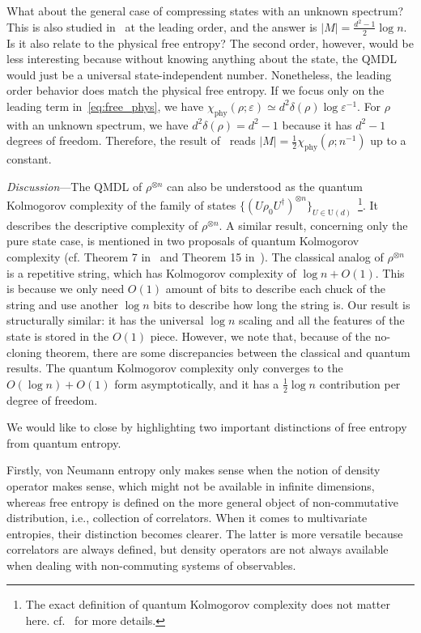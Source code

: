 \documentclass[aps,pre,twocolumn,superscriptaddress,amsmath,amssymb,reprint]{revtex4-2}
\def\eps{\varepsilon}
\begin{document}
What about the general case of compressing states with an unknown spectrum? This is also studied in~\cite{yang2016optimal,yang2018compression} at the leading order, and the answer is $|M| = \frac{d^2-1}{2}\log n$. Is it also relate to the physical free entropy?  The second order, however, would be less interesting because without knowing anything about the state, the QMDL would just be a universal state-independent number. Nonetheless, the leading order behavior does match the physical free entropy. If we focus only on the leading term in~\ref{eq:free_phys}, we have $\chi_\mathrm{phy}(\rho;\eps)\simeq d^2\delta(\rho)\log\eps^{-1}$. For $\rho$ with an unknown spectrum, we have $d^2\delta(\rho) = d^2-1$ because it has $d^2-1$ degrees of freedom. Therefore, the result of~\cite{yang2016optimal,yang2018compression} reads $|M| =\frac12\chi_\mathrm{phy}(\rho;n^{-1})$ up to a constant.


\emph{Discussion}---The QMDL of $\rho^{\otimes n}$ can also be understood as the quantum Kolmogorov complexity of the family of states $\{(U\rho_0 U^\dagger)^{\otimes n}\}_{U\in \text{U}(d)}$~\footnote{The exact definition of quantum Kolmogorov complexity does not matter here. cf.~\cite{mueller2007} for more details.}. It describes the descriptive complexity of  $\rho^{\otimes n}$. A similar result, concerning only the pure state case, is mentioned in two proposals of quantum Kolmogorov complexity (cf. Theorem 7 in~\cite{Berthiaume_2001} and Theorem 15 in~\cite{G_cs_2001}). The classical analog of $\rho^{\otimes n}$ is a repetitive string, which has Kolmogorov complexity of $\log n + O(1)$. This is because we only need $O(1)$ amount of bits to describe each chuck of the string and use another $\log n$ bits to describe how long the string is. Our result is structurally similar: it has the universal $\log n$ scaling and all the features of the state is stored in the $O(1)$ piece. However, we note that, because of the no-cloning theorem, there are some discrepancies between the classical and quantum results. The quantum Kolmogorov complexity only converges to the $O(\log n)+O(1)$ form asymptotically, and it has a $\frac12\log n$ contribution per degree of freedom.



We would like to close by highlighting two important distinctions of free entropy from quantum entropy. 

Firstly, von Neumann entropy only makes sense when the notion of density operator makes sense, which might not be available in infinite dimensions, whereas free entropy is defined on the more general object of non-commutative distribution, i.e., collection of correlators. When it comes to multivariate entropies, their distinction becomes clearer. The latter is more versatile because correlators are always defined, but density operators are not always available when dealing with non-commuting systems of observables. 
\end{document}
